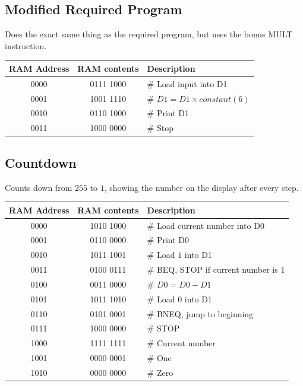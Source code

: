 \documentclass{article}
\begin{document}
	\subsection{Modified Required Program}
	Does the exact same thing as the required program, but uses the bonus MULT instruction.
	\\\begin{tabular}{|c|c|l|}
	\hline \textbf{RAM Address} & \textbf{RAM contents} & \textbf{Description}
	\\ \hline 0000 & 0111 1000 & \# Load input into D1
	\\ \hline 0001 & 1001 1110 & \# $D1=D1\times constant(6)$
	\\ \hline 0010 & 0110 1000 & \# Print D1
	\\ \hline 0011 & 1000 0000 & \# Stop
	\\ \hline
\end{tabular}
\subsection{Countdown}
	Counts down from $255$ to $1$, showing the number on the display after every step.
	\\\begin{tabular}{|c|c|l|}
	\hline \textbf{RAM Address} & \textbf{RAM contents} & \textbf{Description}
	\\ \hline 0000 & 1010 1000& \# Load current number into D0
	\\ \hline 0001 & 0110 0000 & \# Print D0
	\\ \hline 0010 & 1011 1001 & \# Load $1$ into D1
	\\ \hline 0011 & 0100 0111 & \# BEQ, STOP if current number is $1$
	\\ \hline 0100 & 0011 0000 & \# $D0=D0-D1$
	\\ \hline 0101 & 1011 1010 & \# Load $0$ into D1
	\\ \hline 0110 & 0101 0001 & \# BNEQ, jump to beginning
	\\ \hline 0111 & 1000 0000 & \# STOP
	\\ \hline 1000 & 1111 1111 & \# Current number
	\\ \hline 1001 & 0000 0001 & \# One
	\\ \hline 1010 & 0000 0000 & \# Zero
	\\ \hline
\end{tabular}
\end{document}
